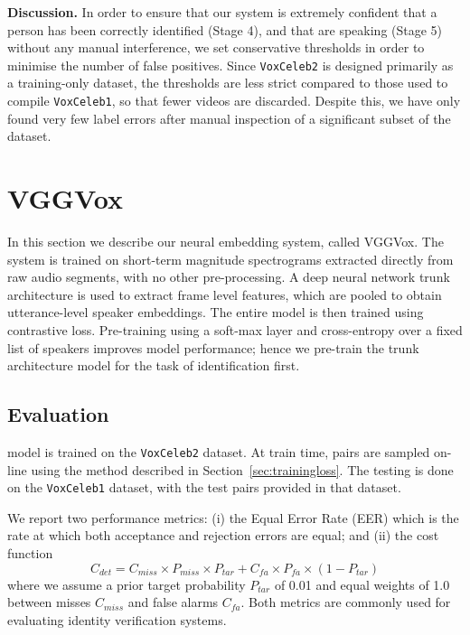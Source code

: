 \documentclass[a4paper]{article}
\def\newpara{\vspace{2pt}}
\def\subsec{\vspace{-5pt}}
\begin{document}
\newpara\noindent\textbf{Discussion. }  
In order to ensure that our system is extremely confident that a
person has been correctly
identified (Stage 4), and that are 
speaking 
 (Stage 5) without any manual interference, we set 
conservative thresholds in order to minimise the
number of false positives.  
Since \texttt{VoxCeleb2} is designed primarily as a training-only dataset,
the thresholds are less strict compared to those used to compile
\texttt{VoxCeleb1}, so that fewer videos are discarded.
Despite this, we have only found very few label errors after manual inspection
of a significant subset of the dataset.


\section{VGGVox}
\label{sec:vggvox}

In this section we describe our neural embedding system, called VGGVox.
  The system is trained on short-term magnitude spectrograms extracted directly from raw audio segments, with no other pre-processing. A deep
neural network trunk architecture is used to extract frame level
features, which are pooled to obtain utterance-level speaker
embeddings. The entire model is then trained using contrastive loss.
Pre-training using a soft-max layer and cross-entropy over a
fixed list of speakers improves model performance; hence we pre-train
the trunk architecture model for the task of identification first.

\subsection{Evaluation}
\subsec
\The model is trained on the \texttt{VoxCeleb2} dataset.
At train time, pairs are sampled on-line using the method described in 
Section~\ref{sec:trainingloss}. The testing is done on the
\texttt{VoxCeleb1} dataset, with the test pairs provided
in that dataset.

We report two performance metrics:
(i) the Equal Error Rate (EER) which is the rate at 
which both acceptance and rejection errors are equal;
and
(ii) the cost function 
\begin{equation}
  C_{det} = C_{miss} \times P_{miss} \times P_{tar} + C_{fa} \times P_{fa} \times (1-P_{tar})
  \label{equ:cdet}
\end{equation}
where we assume a prior target probability $P_{tar}$ of 0.01 and
equal weights of 1.0 between misses $C_{miss}$ and false alarms $C_{fa}$.
Both metrics are commonly used for evaluating  identity 
verification systems.
\end{document}
